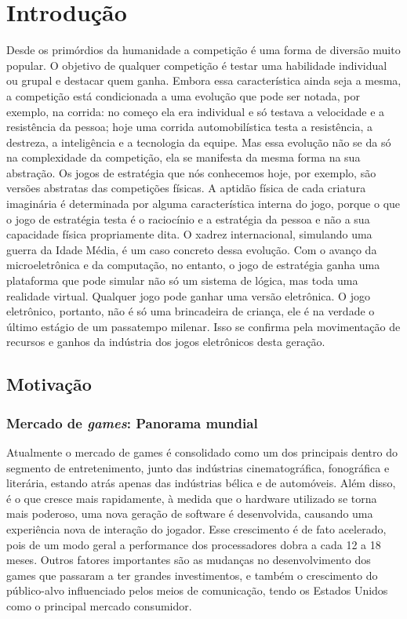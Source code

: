 \chapter{Introdução}
\label{cap:indtroducao}
%
Desde os primórdios da humanidade a competição é uma forma de diversão muito popular. O objetivo de qualquer competição é testar uma habilidade individual ou grupal e destacar quem ganha. Embora essa característica ainda seja a mesma, a competição está condicionada a uma evolução que pode ser notada, por exemplo, na corrida: no começo ela era individual e só testava a velocidade e a resistência da pessoa; hoje uma corrida automobilística testa a resistência, a destreza, a inteligência e a tecnologia da equipe.
Mas essa evolução não se da só na complexidade da competição, ela se manifesta da mesma forma na sua abstração. Os jogos de estratégia que nós conhecemos hoje, por exemplo, são versões abstratas das competições físicas. A aptidão física de cada criatura imaginária é determinada por alguma característica interna do jogo, porque o que o jogo de estratégia testa é o raciocínio e a estratégia da pessoa e não a sua capacidade física propriamente dita. O xadrez internacional, simulando uma guerra da Idade Média, é um caso concreto dessa evolução.
Com o avanço da microeletrônica e da computação, no entanto, o jogo de estratégia ganha uma plataforma que pode simular não só um sistema de lógica, mas toda uma realidade virtual. Qualquer jogo pode ganhar uma versão eletrônica. O jogo eletrônico, portanto, não é só uma brincadeira de criança, ele é na verdade o último estágio de um passatempo milenar. Isso se confirma pela movimentação de recursos e ganhos da indústria dos jogos eletrônicos desta geração.
%
%
\section{Motivação}
%
%
%
\subsection{Mercado de \textit{games}: Panorama mundial}
%
Atualmente o mercado de games é consolidado como um dos principais dentro do segmento de entretenimento, junto das indústrias cinematográfica, fonográfica e literária, estando atrás apenas das indústrias bélica e de automóveis. Além disso, é o que cresce mais rapidamente, à medida que o hardware utilizado se torna mais poderoso, uma nova geração de software é desenvolvida, causando uma experiência nova de interação do jogador. 
Esse crescimento é de fato acelerado, pois de um modo geral a performance dos processadores dobra a cada 12 a 18 meses. Outros fatores importantes são as mudanças no desenvolvimento dos games que passaram a ter grandes investimentos, e também o crescimento do público-alvo influenciado pelos meios de comunicação, tendo os Estados Unidos como o principal mercado consumidor.
%
%
